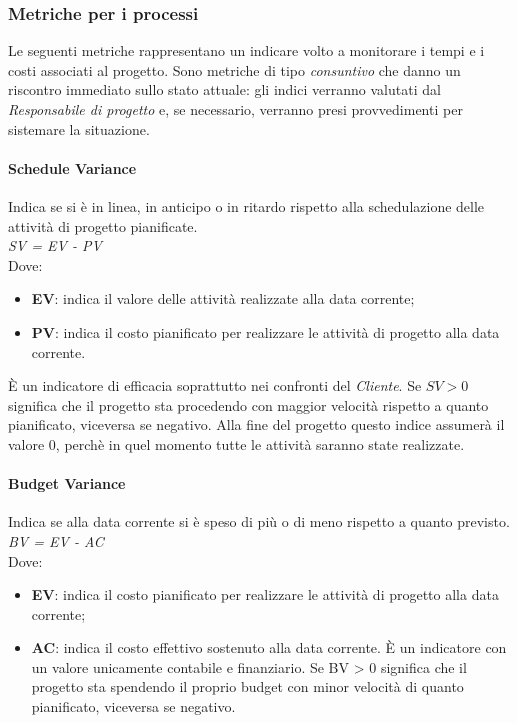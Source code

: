 \subsubsection{Metriche per i processi}
Le seguenti metriche rappresentano un indicare volto a monitorare i tempi e i costi associati al progetto. Sono metriche di tipo \textit{consuntivo} che danno un riscontro immediato sullo stato attuale: gli indici verranno valutati dal \textit{Responsabile di progetto} e, se necessario, verranno presi provvedimenti per sistemare la situazione. 

\paragraph{Schedule Variance}
Indica se si \`e in linea, in anticipo o in ritardo rispetto alla schedulazione delle attività di progetto
pianificate. \\
\textit{SV = EV - PV} \\
Dove:
\begin{itemize}
	\item \textbf{EV}: indica il valore delle attivit\`a realizzate alla data corrente;
	\item \textbf{PV}: indica il costo pianificato per realizzare le attività di progetto alla data corrente.
\end{itemize}
\`E un indicatore di efficacia soprattutto nei confronti del \textit{Cliente}. Se \begin{math}{SV > 0}\end{math} significa che il progetto sta procedendo con maggior velocit\`a rispetto a quanto pianificato, viceversa se negativo. Alla fine del progetto questo indice assumer\`a il valore 0, perch\`e in quel momento tutte le attivit\`a saranno state realizzate.

\paragraph{Budget Variance}
Indica se alla data corrente si \`e speso di pi\`u o di meno rispetto a quanto previsto.\\
\textit{BV = EV - AC}\\
Dove:
\begin{itemize}
	\item \textbf{EV}: indica il costo pianificato per realizzare le attivit\`a di progetto alla data corrente;
	\item \textbf{AC}: indica il costo effettivo sostenuto alla data corrente. \`E un indicatore con
un valore unicamente contabile e finanziario. Se BV > 0 significa che il progetto sta spendendo
il proprio budget con minor velocit\`a di quanto pianificato, viceversa se negativo.
\end{itemize}

